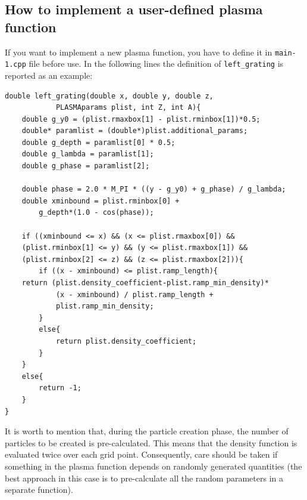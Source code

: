 \documentclass[11pt,a4paper]{report}
\begin{document}
\subsection{How to implement a user-defined plasma function}\label{subsection_upfunc}
If you want to implement a new plasma function, you have to define it in \verb+main-1.cpp+ file before use. In the following lines the definition of \verb+left_grating+ is reported as an example: 
\begin{lstlisting}
double left_grating(double x, double y, double z, 
			PLASMAparams plist, int Z, int A){
	double g_y0 = (plist.rmaxbox[1] - plist.rminbox[1])*0.5;
	double* paramlist = (double*)plist.additional_params;
	double g_depth = paramlist[0] * 0.5;
	double g_lambda = paramlist[1];
	double g_phase = paramlist[2];

	double phase = 2.0 * M_PI * ((y - g_y0) + g_phase) / g_lambda;
	double xminbound = plist.rminbox[0] + 
		g_depth*(1.0 - cos(phase));

	if ((xminbound <= x) && (x <= plist.rmaxbox[0]) &&
	(plist.rminbox[1] <= y) && (y <= plist.rmaxbox[1]) &&
	(plist.rminbox[2] <= z) && (z <= plist.rmaxbox[2])){
		if ((x - xminbound) <= plist.ramp_length){
	return (plist.density_coefficient-plist.ramp_min_density)*
			(x - xminbound) / plist.ramp_length + 
			plist.ramp_min_density;
		}
		else{
			return plist.density_coefficient;
		}
	}
	else{
		return -1;
	}
}
\end{lstlisting}
It is worth to mention that, during the particle creation phase, the number of particles to be created is pre-calculated. This means that the density function is evaluated twice over each grid point. Consequently, care should be taken if something in the plasma function depends on randomly generated quantities (the best approach in this case is to pre-calculate all the random parameters in a separate function).
\end{document}
